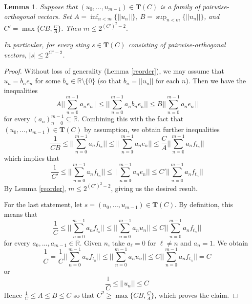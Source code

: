 \documentclass{article}
\newtheorem{lemma}[theorem]{Lemma}
\newcommand{\R}{\mathbb R}
\begin{document}
\begin{lemma}\label{boundedorthogonal}
Suppose that $(u_0,\ldots, u_{m-1})\in \textbf{T}(C)$ is a family of pairwise-orthogonal vectors. Set $A = \inf_{n<m}\{||u_n||\}$, $B = \sup_{n < m} \{||u_n||\}$, and $C' = \max\{C B, \frac{C}{A}\}$. Then $m \leq 2^{(C')^2-2}$. 

In particular, for every sting $s\in \textbf{T}(C)$ consisting of pairwise-orthogonal vectors, $|s|\leq 2^{C^4-2}$.
\end{lemma}

\begin{proof}
Without loss of generality (Lemma \ref{reorder}), we may assume that $u_n = b_n e_n$ for some $b_n\in\mathbb R\setminus\{0\}$ (so that $b_n = ||u_n||$ for each $n$). Then we have the inequalities
\begin{equation*}
A\bigg|\bigg|\sum_{n=0}^{m-1} a_n e_n\bigg|\bigg| \leq \bigg|\bigg|\sum_{n=0}^{m-1} a_n b_n e_n\bigg|\bigg| \leq B\bigg|\bigg|\sum_{n=0}^{m-1} a_n e_n\bigg|\bigg|
\end{equation*}
for every $(a_n)_{n=0}^{m-1}\subseteq \R$. Combining this with the fact that $(u_0,\ldots, u_{m-1})\in \textbf{T}(C)$ by assumption, we obtain further inequalities
\begin{equation*}
\frac{1}{C B} \leq \bigg|\bigg|\sum_{n=0}^{m-1} a_n f_{t_n}\bigg|\bigg| \leq \bigg|\bigg|\sum_{n=0}^{m-1} a_n e_n\bigg|\bigg| \leq \frac{C}{A} \bigg|\bigg| \sum_{n=0}^{m-1} a_n f_{t_n}\bigg|\bigg|
\end{equation*}
which implies that
\begin{equation*}
\frac{1}{C'} \leq \bigg|\bigg|\sum_{n=0}^{m-1} a_n f_{t_n}\bigg|\bigg| \leq \bigg|\bigg|\sum_{n=0}^{m-1} a_n e_n\bigg|\bigg| \leq C' \bigg|\bigg| \sum_{n=0}^{m-1} a_n f_{t_n}\bigg|\bigg|
\end{equation*}
By Lemma \ref{reorder}, $m\leq 2^{(C')^2-2}$, giving us the desired result.

For the last statement, let $s = (u_0,\ldots, u_{m-1})\in\textbf{T}(C)$. By definition, this means that 
\begin{equation*}
\frac{1}{C} \leq \bigg|\bigg|\sum_{n=0}^{m-1} a_n f_{t_n}\bigg|\bigg| \leq \bigg|\bigg|\sum_{n=0}^{m-1} a_n u_n\bigg|\bigg| \leq C \bigg|\bigg| \sum_{n=0}^{m-1} a_n f_{t_n}\bigg|\bigg|
\end{equation*}
for every $a_0,\ldots, a_{m-1}\in \mathbb R$. Given $n$, take $a_\ell = 0$ for $\ell\neq n$ and $a_n = 1$. We obtain
\begin{equation*}
\frac{1}{C} = \frac{1}{C} \bigg|\bigg|\sum_{n=0}^{m-1} a_n f_{t_n}\bigg|\bigg| \leq \bigg|\bigg|\sum_{n=0}^{m-1} a_n u_n\bigg|\bigg| \leq C \bigg|\bigg| \sum_{n=0}^{m-1} a_n f_{t_n}\bigg|\bigg| = C
\end{equation*}
or
\begin{equation*}
\frac{1}{C}\leq ||u_n|| \leq C
\end{equation*}
Hence $\frac{1}{C}\leq A \leq B\leq C$ so that $C^2\geq \max\{C B,\frac{C}{A}\}$, which proves the claim.
\end{proof}
\end{document}
